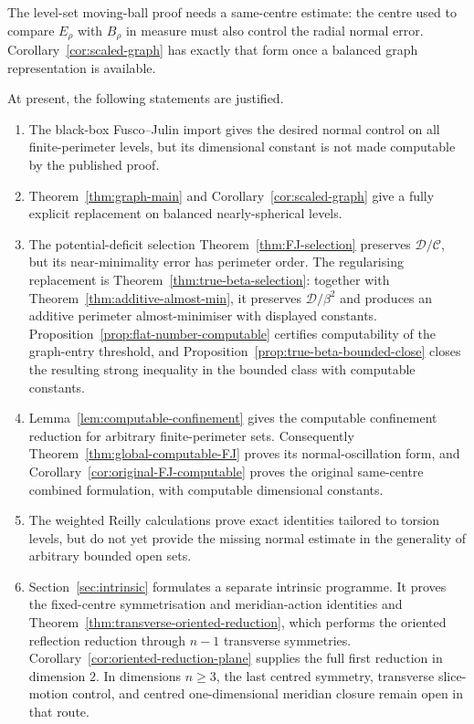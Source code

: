 \documentclass[11pt]{amsart}
\theoremstyle{definition}
\newcommand{\Def}{\mathcal D}
\begin{document}
The level-set moving-ball proof needs a same-centre estimate: the centre used
to compare \(E_\rho\) with \(B_\rho\) in measure must also control the radial
normal error.  Corollary~\ref{cor:scaled-graph} has exactly that form once a
balanced graph representation is available.

At present, the following statements are justified.
\begin{enumerate}[label=\textnormal{(\arabic*)},leftmargin=2.6em]
\item The black-box Fusco--Julin import gives the desired normal control on
all finite-perimeter levels, but its dimensional constant is not made
computable by the published proof.
\item Theorem~\ref{thm:graph-main} and Corollary~\ref{cor:scaled-graph} give a
fully explicit replacement on balanced nearly-spherical levels.
\item The potential-deficit selection
Theorem~\ref{thm:FJ-selection} preserves \(\Def/\mathcal C\), but its
near-minimality error has perimeter order.  The regularising replacement is
Theorem~\ref{thm:true-beta-selection}: together with
Theorem~\ref{thm:additive-almost-min}, it preserves
\(\Def/\beta^2\) and produces an additive perimeter almost-minimiser with
displayed constants.  Proposition~\ref{prop:flat-number-computable}
certifies computability of the graph-entry threshold, and
Proposition~\ref{prop:true-beta-bounded-close} closes the resulting
strong inequality in the bounded class with computable constants.
\item Lemma~\ref{lem:computable-confinement} gives the computable
confinement reduction for arbitrary finite-perimeter sets.  Consequently
Theorem~\ref{thm:global-computable-FJ} proves its normal-oscillation form,
and Corollary~\ref{cor:original-FJ-computable} proves the original
same-centre combined formulation, with computable dimensional constants.
\item The weighted Reilly calculations prove exact identities tailored to
torsion levels, but do not yet provide the missing normal estimate in the
generality of arbitrary bounded open sets.
\item Section~\ref{sec:intrinsic} formulates a separate intrinsic programme.
It proves the fixed-centre symmetrisation and meridian-action identities
and Theorem~\ref{thm:transverse-oriented-reduction}, which performs the
oriented reflection reduction through \(n-1\) transverse symmetries.
Corollary~\ref{cor:oriented-reduction-plane} supplies the full first
reduction in dimension \(2\).  In dimensions \(n\ge3\), the last
centred symmetry, transverse slice-motion control, and centred
one-dimensional meridian closure remain open in that route.
\end{enumerate}
\end{document}
